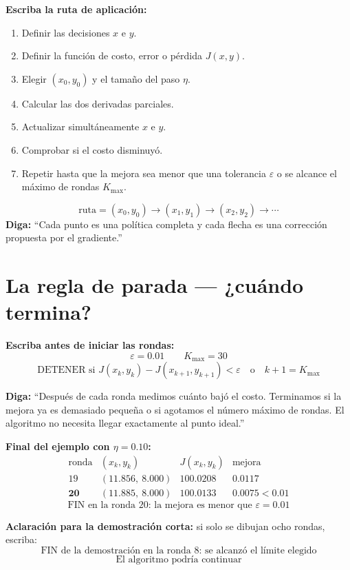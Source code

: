 \documentclass[11pt]{article}
\begin{document}
\textbf{Escriba la ruta de aplicación:}
\begin{enumerate}[leftmargin=1.8em]
\item Definir las decisiones $x$ e $y$.
\item Definir la función de costo, error o pérdida $J(x,y)$.
\item Elegir $(x_0,y_0)$ y el tamaño del paso $\eta$.
\item Calcular las dos derivadas parciales.
\item Actualizar simultáneamente $x$ e $y$.
\item Comprobar si el costo disminuyó.
\item Repetir hasta que la mejora sea menor que una tolerancia
      $\varepsilon$ o se alcance el máximo de rondas $K_{\max}$.
\end{enumerate}

\[
\boxed{\text{ruta}=(x_0,y_0)\longrightarrow(x_1,y_1)
\longrightarrow(x_2,y_2)\longrightarrow\cdots}
\]
\textbf{Diga:} ``Cada punto es una política completa y cada flecha es una
corrección propuesta por el gradiente.''

\section*{La regla de parada --- ¿cuándo termina?}
\textbf{Escriba antes de iniciar las rondas:}
\[
\boxed{\varepsilon=0.01\qquad K_{\max}=30}
\]
\[
\boxed{
\text{DETENER si }
J(x_k,y_k)-J(x_{k+1},y_{k+1})<\varepsilon
\quad\text{o}\quad k+1=K_{\max}}
\]

\textbf{Diga:} ``Después de cada ronda medimos cuánto bajó el costo. Terminamos
si la mejora ya es demasiado pequeña o si agotamos el número máximo de rondas.
El algoritmo no necesita llegar exactamente al punto ideal.''

\textbf{Final del ejemplo con $\eta=0.10$:}
\[
\begin{array}{c|c|c|c}
\text{ronda}&(x_k,y_k)&J(x_k,y_k)&\text{mejora}\\
\hline
19&(11.856,\ 8.000)&100.0208&0.0117\\
\mathbf{20}&\mathbf{(11.885,\ 8.000)}&\mathbf{100.0133}&
\mathbf{0.0075<0.01}
\end{array}
\]
\[
\boxed{\text{FIN en la ronda 20: la mejora es menor que }\varepsilon=0.01}
\]

\textbf{Aclaración para la demostración corta:} si solo se dibujan ocho rondas,
escriba:
\[
\boxed{\text{FIN de la demostración en la ronda 8: se alcanzó el límite elegido}}
\]
\[
\boxed{\text{El algoritmo podría continuar}}
\]
\end{document}
